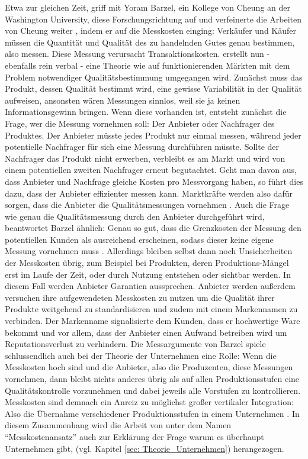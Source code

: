 Etwa zur gleichen Zeit, griff mit Yoram Barzel, ein Kollege von Cheung an der Washington University, diese Forschungsrichtung auf und verfeinerte die Arbeiten von Cheung weiter \parencite[S. 33]{North1990}, indem er auf die Messkosten einging: Verkäufer und Käufer müssen die Quantität und Qualität des zu handelnden Gutes genau bestimmen, also messen. Diese Messung verursacht Transaktionskosten. \textcite{Barzel1982} erstellt nun - ebenfalls rein verbal - eine Theorie wie auf funktionierenden Märkten mit dem Problem notwendiger Qualitätsbestimmung umgegangen wird. Zunächst muss das Produkt, dessen Qualität bestimmt wird, eine gewisse Variabilität in der Qualität aufweisen, ansonsten wären Messungen sinnlos, weil sie ja keinen Informationsgewinn bringen. Wenn diese vorhanden ist, entsteht zunächst die Frage, wer die Messung vornehmen soll: Der Anbieter oder Nachfrager des Produktes. Der Anbieter müsste jedes Produkt nur einmal messen, während jeder potentielle Nachfrager für sich eine Messung durchführen müsste. Sollte der Nachfrager das Produkt nicht erwerben, verbleibt es am Markt und wird von einem potentiellen zweiten Nachfrager erneut begutachtet. Geht man davon aus, dass Anbieter und Nachfrage gleiche Kosten pro Messvorgang haben, so führt dies dazu, dass der Anbieter effizienter messen kann. Marktkräfte werden also dafür sorgen, dass die Anbieter die Qualitätsmessungen vornehmen \parencite[S. 30]{Barzel1982}. Auch die Frage wie genau die Qualitätsmessung durch den Anbieter durchgeführt wird, beantwortet Barzel ähnlich: Genau so gut, dass die Grenzkosten der Messung den potentiellen Kunden als ausreichend erscheinen, sodass dieser keine eigene Messung vornehmen muss \parencite[S. 30]{Barzel1982}. Allerdings bleiben selbst dann noch Unsicherheiten der Messkosten übrig, zum Beispiel bei Produkten, deren Produktions-Mängel erst im Laufe der Zeit, oder durch Nutzung entstehen oder sichtbar werden. In diesem Fall werden Anbieter Garantien aussprechen. Anbieter werden außerdem versuchen ihre aufgewendeten Messkosten zu nutzen um die Qualität ihrer Produkte weitgehend zu standardisieren und zudem mit einem Markennamen zu verbinden. Der Markenname signalisierte dem Kunden, dass er hochwertige Ware bekommt und vor allem, dass der Anbieter einen Aufwand betreiben wird um Reputationsverlust zu verhindern. Die Messargumente von Barzel spiele schlussendlich auch bei der Theorie der Unternehmen eine Rolle: Wenn die Messkosten hoch sind und die Anbieter, also die Produzenten, diese Messungen vornehmen, dann bleibt nichts anderes übrig als auf allen Produktionsstufen eine Qualitätskontrolle vorzunehmen und dabei jeweils alle Vorstufen zu kontrollieren. Messkosten sind demnach ein Anreiz zu möglichst großer vertikaler Integration: Also die Übernahme verschiedener Produktionsstufen in einem Unternehmen \parencite[S. 42]{Barzel1982}. In diesem Zusammenhang wird die Arbeit von \textcite{Barzel1982} unter dem Namen "`Messkostenansatz"' auch zur Erklärung der Frage warum es überhaupt Unternehmen gibt, (vgl. Kapitel \ref{sec: Theorie_Unternehmen}) herangezogen. 

